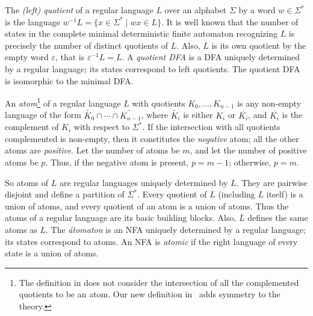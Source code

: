 \documentclass{llncs}
\newcommand{\ol}{\overline}
\newcommand{\eps}{\varepsilon}
\newcommand{\Sig}{\Sigma}
\begin{document}
The \emph{(left) quotient} of a regular language $L$ over an 
alphabet $\Sig$ by a word $w\in\Sig^*$ is the language 
$w^{-1}L=\{x\in\Sig^*\mid wx\in L\}$.
It is well known that the number of states in the complete minimal 
deterministic finite automaton recognizing $L$ is precisely 
the number of distinct quotients of $L$. 
Also, $L$ is its own quotient by the empty word $\eps$, that is $\eps^{-1}L=L$.
A \emph{quotient DFA} is a DFA uniquely determined by a regular language; its states correspond to left quotients. The quotient DFA is isomorphic to the minimal DFA.

An \emph{atom}\footnote{The definition in \cite{BrTa11} does not consider 
the intersection of all the complemented quotients to be an atom. 
Our new definition in~\cite{BrTa12} adds symmetry to the theory.}
of a regular language $L$ with quotients $K_0,\ldots, K_{n-1}$ is any 
non-empty language of the form 
$\widetilde{K_0}\cap \cdots \cap \widetilde{K_{n-1}}$, 
where $\widetilde{K_i}$ is either $K_i$ or $\ol{K_i}$, and $\ol{K_i}$ is the complement of $K_i$ with respect to $\Sig^*$.   
If the intersection with all quotients complemented is non-empty, then it constitutes the \emph{negative} atom;  
all the other atoms are \emph{positive}.
Let the number of atoms be $m$, and let the number of positive atoms be $p$. 
Thus, if the negative atom is present, $p=m-1$; otherwise, $p=m$.

So atoms of $L$ are regular languages uniquely determined by $L$. 
They are pairwise disjoint and define a partition of $\Sig^*$. 
Every quotient of $L$ (including $L$ itself)  
is a union of atoms, and  every quotient of an atom is a union of atoms.
Thus the atoms of a regular language are its basic building blocks. 
Also, $\ol{L}$ defines the same atoms as   $L$. 
The \emph{\'atomaton} is an NFA uniquely determined by a regular language; its states correspond to atoms. 
An NFA is \emph{atomic} if the right language of every state is a union of atoms.
\smallskip
\end{document}
